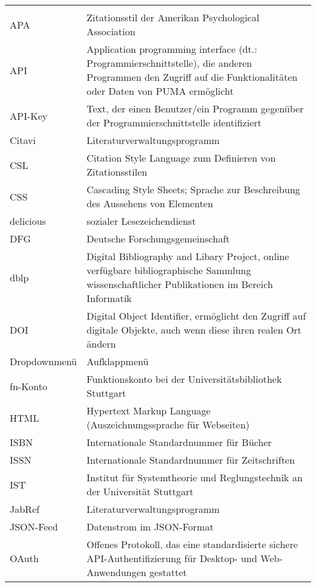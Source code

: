 \begin{longtable}{l p{8cm}}
 & }\\
APA&Zitationsstil der Amerikan Psychological Association\\ 
API&  Application programming interface (dt.: Programmierschnittstelle), die anderen Programmen den Zugriff auf die Funktionalitäten oder Daten von PUMA ermöglicht\\
API-Key&Text, der einen Benutzer/ein Programm gegenüber der Programmierschnittstelle identifiziert\\
Citavi & Literaturverwaltungsprogramm\\
CSL&Citation Style Language zum Definieren von Zitationsstilen\\
CSS&Cascading Style Sheets; Sprache zur Beschreibung des Aussehens von Elementen\\
delicious&sozialer Lesezeichendienst\\
DFG&Deutsche Forschungsgemeinschaft\\
dblp&Digital Bibliography and Libary Project, online verfügbare bibliographische Sammlung wissenschaftlicher Publikationen im Bereich Informatik\\
DOI&  Digital Object Identifier, ermöglicht den Zugriff auf digitale Objekte, auch wenn diese ihren realen Ort ändern\\
Dropdownmenü&Aufklappmenü\\
fn-Konto&Funktionskonto bei der Universitätsbibliothek Stuttgart\\
HTML  & Hypertext Markup Language (Auszeichnungssprache für Webseiten)\\
ISBN & Internationale Standardnummer für Bücher\\
ISSN & Internationale Standardnummer für Zeitschriften\\
IST &  Institut für Systemtheorie und Reglungstechnik an der Universität Stuttgart\\ 
JabRef & Literaturverwaltungsprogramm\\
JSON-Feed&Datenstrom im JSON-Format\\
OAuth & Offenes Protokoll, das eine standardisierte sichere API-Authentifizierung für Desktop- und Web- Anwendungen gestattet\\

\end{longtable}

